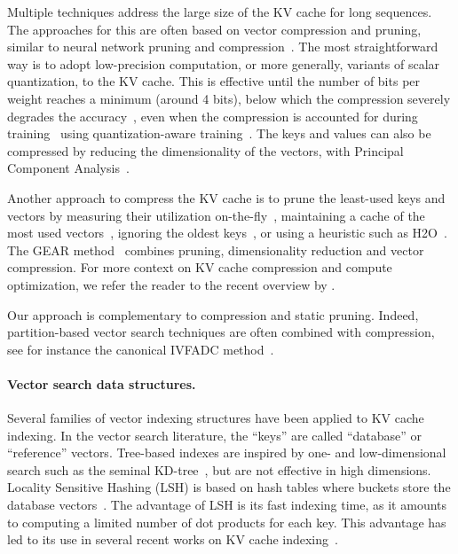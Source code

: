 Multiple techniques address the large size of the KV cache for long sequences. 
The approaches for this are often based on vector compression and pruning, similar to neural network pruning \citep{lecun1989optimal}  and compression~\citep{han2015deep}.
%
The most straightforward way is to adopt low-precision computation, or more generally, variants of scalar quantization, to the KV cache.
%
This is effective until the number of bits per weight reaches a minimum (around 4 bits), below which the compression severely degrades the accuracy~\citep{li2024evaluating}, even when the compression is accounted for during training~\citep{adepu2024framequant} using quantization-aware training~\citep{hubara2018quantized}. 
The keys and values can also be compressed by reducing the dimensionality of the vectors, \eg with Principal Component Analysis~\citep{kang2024gear}.

Another approach to compress the KV cache is to prune the least-used keys and vectors by measuring their utilization on-the-fly~\citep{ge2023model}, maintaining a cache of the most used vectors~\citep{liu2024scissorhands}, ignoring the oldest keys~\citep{xiao2024efficientstreaminglanguagemodels}, or using a heuristic such as H2O~\citep{zhang2023h2o}.
The GEAR method~\citep{kang2024gear} combines pruning, dimensionality reduction and vector compression.
For more context on KV cache compression and compute optimization, we refer the reader to the recent overview by \citet{shi2024keep}.

Our \OURS approach is complementary to compression and static pruning. 
Indeed, partition-based vector search techniques are often combined with compression, see for instance the canonical IVFADC method~\citep{jegou2010product}. 

%

%

%
%

%

%
%

\paragraph{Vector search data structures.}

Several families of vector indexing structures have been applied to KV cache indexing.  
In the vector search literature, the ``keys'' are called ``database'' or ``reference'' vectors. 
%
Tree-based indexes are inspired by one- and low-dimensional search such as the seminal KD-tree~\cite{bentley1975multidimensional}, 
%
but are not effective in high dimensions. 
%
%
 Locality Sensitive Hashing (LSH) is based on hash tables where buckets store the database vectors~\citep{datar2004locality}. 
The advantage of LSH is its fast indexing time, as it amounts to computing a limited number of dot products for each key. 
This advantage has led to its use in several recent works on KV cache indexing~\citep{zandieh2023kdeformer,zhuoming2024magicpig}. 

